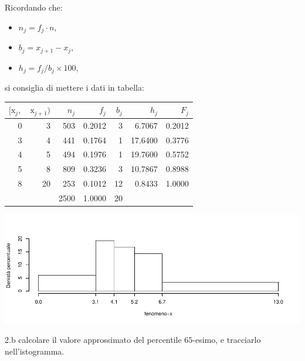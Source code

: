 \documentclass[
  11pt,
]{book}
\providecommand{\tightlist}{%
  \setlength{\itemsep}{0pt}\setlength{\parskip}{0pt}}
\theoremstyle{mytheoremstyle}
\theoremstyle{mydefstyle}
\newenvironment{sol}
  {
  \begin{tcolorbox}[enhanced,breakable,arc=0.1mm,boxrule=1pt,colback=white,colframe=iblue,
  title=\bf \fontfamily{lmss}\selectfont \hspace{.5 cm} Soluzione,drop fuzzy shadow]

}{
\end{tcolorbox}
  }
\begin{document}
\begin{sol}

Ricordando che:

\begin{itemize}
\tightlist
\item
  \(n_j=f_j\cdot n\),
\item
  \(b_j=x_{j+1}-x_{j}\),
\item
  \(h_j=f_j/b_j\times 100\),
\end{itemize}

si consiglia di mettere i dati in tabella:

\begin{table}[H]
\centering
\begin{tabular}{rrrrrrr}
\toprule
$[\text{x}_j,$ & $\text{x}_{j+1})$ & $n_j$ & $f_j$ & $b_j$ & $h_j$ & $F_j$\\
\midrule
0 & 3 & 503 & 0.2012 & 3 & 6.7067 & 0.2012\\
3 & 4 & 441 & 0.1764 & 1 & 17.6400 & 0.3776\\
4 & 5 & 494 & 0.1976 & 1 & 19.7600 & 0.5752\\
5 & 8 & 809 & 0.3236 & 3 & 10.7867 & 0.8988\\
8 & 20 & 253 & 0.1012 & 12 & 0.8433 & 1.0000\\
 &  & 2500 & 1.0000 & 20 &  & \\
\bottomrule
\end{tabular}
\end{table}

\begin{center}\includegraphics{Esami_passati_con_soluzioni_files/figure-latex/4-1} \end{center}

\end{sol}

2.b calcolare il valore approssimato del percentile \(65\)-esimo, e tracciarlo nell'istogramma.
\end{document}
